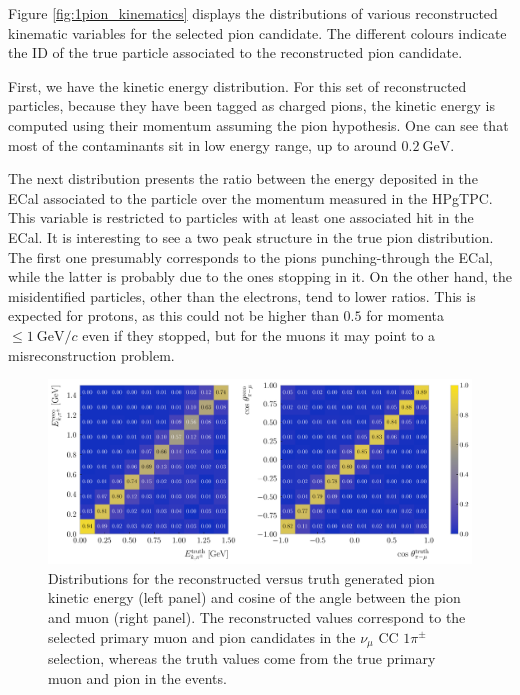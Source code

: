 Figure \ref{fig:1pion_kinematics} displays the distributions of various reconstructed kinematic variables for the selected pion candidate. The different colours indicate the ID of the true particle associated to the reconstructed pion candidate.

First, we have the kinetic energy distribution. For this set of reconstructed particles, because they have been tagged as charged pions, the kinetic energy is computed using their momentum assuming the pion hypothesis. One can see that most of the contaminants sit in low energy range, up to around $0.2~\mathrm{GeV}$.

The next distribution presents the ratio between the energy deposited in the ECal associated to the particle over the momentum measured in the HPgTPC. This variable is restricted to particles with at least one associated hit in the ECal. It is interesting to see a two peak structure in the true pion distribution. The first one presumably corresponds to the pions punching-through the ECal, while the latter is probably due to the ones stopping in it. On the other hand, the misidentified particles, other than the electrons, tend to lower ratios. This is expected for protons, as this could not be higher than $0.5$ for momenta $\leq 1~\mathrm{GeV}/c$ even if they stopped, but for the muons it may point to a misreconstruction problem.

\begin{figure}[t]
    \centering
    \includegraphics[width=.99\linewidth]{Images/GAr_selection/pion_selection_1pion_kinematic_comp.pdf}
    \caption[Distributions for the reconstructed versus truth pion kinetic energy and angle between the pion and muon in the $\nu_{\mu}$ CC $1\pi^{\pm}$ selection.]{Distributions for the reconstructed versus truth generated pion kinetic energy (left panel) and cosine of the angle between the pion and muon (right panel). The reconstructed values correspond to the selected primary muon and pion candidates in the $\nu_{\mu}$ CC $1\pi^{\pm}$ selection, whereas the truth values come from the true primary muon and pion in the events.}
    \label{fig:1pion_kinematic_comp}
\end{figure}

